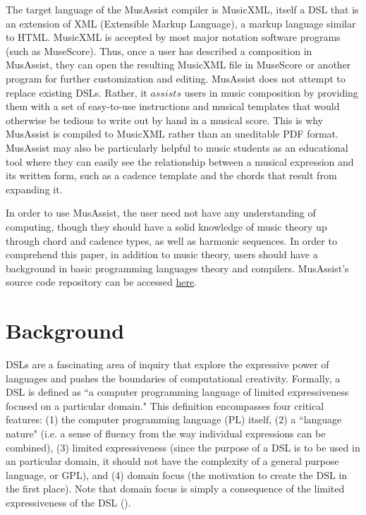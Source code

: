 \documentclass{report}
\newcommand\citeparen[1]{(\cite{#1})}
\begin{document}
The target language of the MusAssist compiler is MusicXML, itself a DSL that is an extension of  XML (Extensible Markup Language), a markup language similar to HTML. MusicXML is accepted by most major notation software programs (such as MuseScore). Thus, once a user has described a composition in MusAssist, they can open the resulting MusicXML file in MuseScore or another program for further customization and editing. MusAssist does not attempt to replace existing DSLs. Rather, it $assists$ users in music composition by providing them with a set of easy-to-use instructions and musical templates that would otherwise be tedious to write out by hand in a musical score. This is why MusAssist is compiled to MusicXML rather than an uneditable PDF format. MusAssist may also be particularly helpful to music students as an educational tool where they can easily see the relationship between a musical expression and its written form, such as a cadence template and the chords that result from expanding it.

In order to use MusAssist, the user need not have any understanding of computing, though they should have a solid knowledge of music theory up through chord and cadence types, as well as harmonic sequences. In order to  comprehend this paper, in addition to music theory, users should have a background in basic programming languages theory and compilers. MusAssist's source code repository can be accessed \href{https://github.com/ilanashapiro/MusAssist}{here}.

\chapter{Background}
\label{chap:background}

DSLs are a fascinating area of inquiry that explore the expressive power of languages and pushes the boundaries of computational creativity. Formally, a DSL is defined as ``a computer programming language of limited expressiveness focused on a particular domain." This definition encompasses four critical features: (1) the computer programming language (PL) itself, (2) a ``language nature" (i.e. a sense of fluency from the way individual expressions can be combined), (3) limited expressiveness (since the purpose of a DSL is to be used in an particular domain, it should not have the complexity of a general purpose language, or GPL), and (4) domain focus (the motivation to create the DSL in the first place). Note that domain focus is  simply a consequence of the limited expressiveness of the DSL \citeparen{fowler_parsons_2011}.
\end{document}
